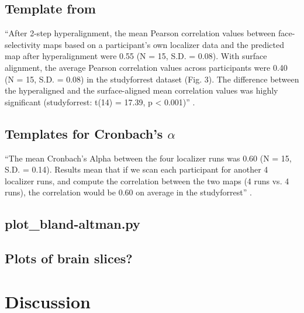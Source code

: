 \subsection{Template from \citet{jiahui2020predicting}}

%
``After 2-step hyperalignment, the mean Pearson correlation values between
face-selectivity maps based on a participant's own localizer data and the
predicted map after hyperalignment were 0.55 (N = 15, S.D. = 0.08).
%
With surface alignment, the average Pearson correlation values across
participants were 0.40 (N = 15, S.D. = 0.08) in the studyforrest dataset (Fig.
3).
%
The difference between the hyperaligned and the surface-aligned mean correlation
values was highly significant (studyforrest: t(14) = 17.39, p < 0.001)''
\citep{jiahui2020predicting}.



\subsection{Templates for Cronbach's $\alpha$}

``The mean Cronbach's Alpha between the four localizer runs was 0.60 (N = 15,
S.D.  = 0.14).
%
Results mean that if we scan each participant for another 4 localizer runs, and
compute the correlation between the two maps (4 runs vs. 4 runs), the
correlation would be 0.60 on average in the studyforrest''
\citep{jiahui2020predicting}.



\subsection{plot\_bland-altman.py}



\subsection{Plots of brain slices?}






\section{Discussion}

